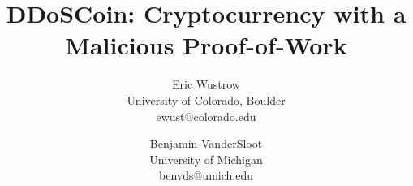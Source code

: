 \documentclass[letterpaper,twocolumn,10pt]{article}
\begin{document}
\title{DDoSCoin: Cryptocurrency with a Malicious Proof-of-Work}

\author{\rm{Eric Wustrow}\\
University of Colorado, Boulder\\
{\small ewust@colorado.edu}
\and
\rm{Benjamin VanderSloot}\\
University of Michigan\\
{\small benvds@umich.edu}
}

\maketitle
\end{document}
